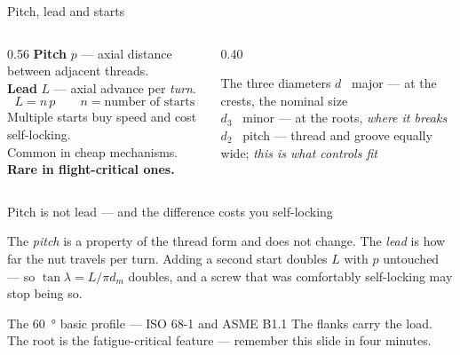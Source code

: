 \documentclass[aspectratio=169,10pt]{beamer}
\begin{document}
\begin{frame}{Pitch, lead and starts}
\begin{columns}[T]
\begin{column}{0.56\textwidth}
\textbf{Pitch} $p$ --- axial distance between adjacent threads.\\[6pt]
\textbf{Lead} $L$ --- axial advance per \emph{turn}.\\[6pt]
\[\boxed{L = n\,p}\qquad n = \text{number of starts}\]
\vspace{4pt}
Multiple starts buy speed and cost self-locking.\\[4pt]
Common in cheap mechanisms.\\
\textbf{Rare in flight-critical ones.}
\end{column}
\begin{column}{0.40\textwidth}
\begin{block}{The three diameters}
\small
$d$ \ major --- at the crests, the nominal size\\[3pt]
$d_3$ \ minor --- at the roots, \emph{where it breaks}\\[3pt]
$d_2$ \ pitch --- thread and groove equally wide; \emph{this is what controls fit}
\end{block}
\end{column}
\end{columns}
\end{frame}

\begin{frame}{Pitch is not lead --- and the difference costs you self-locking}
\centering
\resizebox{!}{4.6cm}{}
\vfill
\raggedright
{\small The \emph{pitch} is a property of the thread form and does not change. The \emph{lead} is how
far the nut travels per turn. Adding a second start doubles $L$ with $p$ untouched --- so
$\tan\lambda = L/\pi d_m$ doubles, and a screw that was comfortably self-locking may stop being so.}
\end{frame}

\begin{frame}{The \SI{60}{\degree} basic profile --- ISO 68-1 and ASME B1.1}
\centering
\resizebox{0.86\textwidth}{!}{}
\vfill
{\small The flanks carry the load. \alert{The root is the fatigue-critical feature} --- remember this
slide in four minutes.}
\end{frame}
\end{document}
